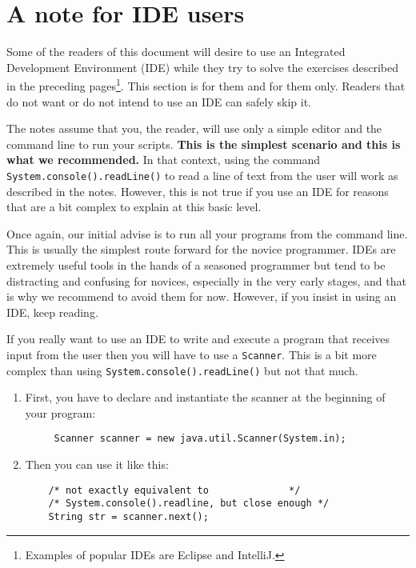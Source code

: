 
\section{A note for IDE users}
\label{sec:note-ide-users}

Some of the readers of this document will desire to use an Integrated
Development Environment (IDE) while they try to solve the exercises
described in the preceding 
pages\footnote{Examples of popular IDEs are Eclipse and IntelliJ. }. 
This section is for them and for
them only. Readers that do not want or do not intend to use an IDE can
safely skip it. 

The notes assume that you, the reader, will use 
only a simple editor and the command line to run your scripts. 
\textbf{This is the simplest scenario
and this is what we recommended.} 
In that context, using the command
\verb+System.console().readLine()+ to read a line of text from the
user will work as described in the notes. However, this is not true if
you use an IDE for reasons that are a bit complex to explain at this
basic level.

Once again, our initial advise is to run all your programs from the
command line. This is usually the simplest route forward for the
novice programmer. IDEs are extremely useful tools in the hands of a
seasoned programmer but tend to be distracting and confusing for
novices, especially in the very early stages, and that is why we
recommend to avoid them for now. However, if you insist in using an
IDE, keep reading. 

If you really want to use an IDE to write and execute a program that
receives input from the user then you will have to use a
\verb+Scanner+. This is a bit more complex than using
\verb+System.console().readLine()+ but not that much.

\begin{enumerate}
\item First, you have to declare and instantiate the scanner at the
beginning of your program:

\begin{verbatim}
     Scanner scanner = new java.util.Scanner(System.in);
\end{verbatim}

\item Then you can use it like this:

\begin{verbatim}
    /* not exactly equivalent to              */
    /* System.console().readline, but close enough */
    String str = scanner.next();
\end{verbatim}

\end{enumerate}


